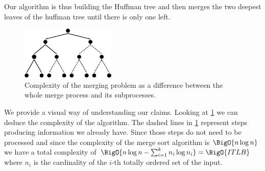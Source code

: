 Our algorithm is thus building the Huffman tree and then merges the two deepest
leaves of the huffman tree until there is only one left.

\begin{figure}
	\centering
	\includegraphics[width=0.4\textwidth]{fig/merging/huffman-2-trim}
	\caption{Complexity of the merging problem as a difference between the whole merge process and its subprocesses.}
	\label{tree:merging:fig/huffman-2}
\end{figure}

We provide a visual way of understanding our claims. Looking at
\ref{tree:merging:fig/huffman-2} we can deduce the complexity of the algorithm.
The dashed lines in \ref{tree:merging:fig/huffman-2} represent steps producing
information we already have. Since those steps do not need to be processed and
since the complexity of the merge sort algorithm is $\BigO{n \log n}$ we have a
total complexity of $\BigO{n \log n - \sum_{i=1}^{k} n_i \log n_i} =
\BigO{ITLB}$ where $n_i$ is the cardinality of the $i$-th totally ordered set
of the input.
